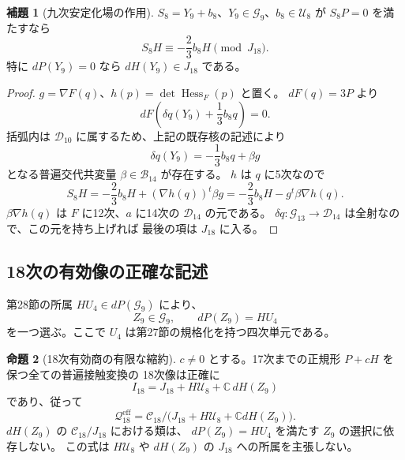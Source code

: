 \documentclass[a4paper,11pt]{ltjsarticle}
\theoremstyle{definition}
\newtheorem{theorem}{命題}[section]
\newtheorem{lemma}[theorem]{補題}
\newcommand{\CC}{\mathbb C}
\begin{document}
\begin{lemma}[九次安定化場の作用]
\label{lem:v14-ninth-stabilizer-hessian}
$S_8=Y_9+b_8$、$Y_9\in\mathcal G_9$、$b_8\in\mathcal U_8$ が
$S_8P=0$ を満たすなら
\[
 S_8H\equiv-\frac23b_8H\pmod{J_{18}}.
\]
特に $dP(Y_9)=0$ なら $dH(Y_9)\in J_{18}$ である。
\end{lemma}

\begin{proof}
$g=\nabla F(q)$、$h(p)=\det\operatorname{Hess}_F(p)$ と置く。
$dF(q)=3P$ より
\[
 dF\left(\delta q(Y_9)+\frac13b_8q\right)=0.
\]
括弧内は $\mathcal D_{10}$ に属するため、上記の既存核の記述により
\[
 \delta q(Y_9)=-\frac13b_8q+\beta g
\]
となる普遍交代共変量 $\beta\in\mathcal B_{14}$ が存在する。
$h$ は $q$ に5次なので
\[
 S_8H=-\frac23b_8H+(\nabla h(q))^t\beta g
     =-\frac23b_8H-g^t\beta\nabla h(q).
\]
$\beta\nabla h(q)$ は $F$ に12次、$a$ に14次の $\mathcal D_{14}$ の元である。
$\delta q:\mathcal G_{13}\to\mathcal D_{14}$ は全射なので、この元を持ち上げれば
最後の項は $J_{18}$ に入る。
\end{proof}

\subsection{18次の有効像の正確な記述}

第28節の所属 $HU_4\in dP(\mathcal G_9)$ により、
\[
 Z_9\in\mathcal G_9,\qquad dP(Z_9)=HU_4
\]
を一つ選ぶ。ここで $U_4$ は第27節の規格化を持つ四次単元である。

\begin{theorem}[18次有効商の有限な縮約]
\label{thm:v14-effective-eighteenth}
$c\ne0$ とする。17次までの正規形 $P+cH$ を保つ全ての普遍接触変換の
18次像は正確に
\begin{equation}\label{eq:v14-effective-image}
 I_{18}=J_{18}+H\mathcal U_8+\CC\,dH(Z_9)
\end{equation}
であり、従って
\[
 \mathcal Q^{\mathrm{eff}}_{18}
 =\mathcal C_{18}/\bigl(J_{18}+H\mathcal U_8+\CC dH(Z_9)\bigr).
\]
$dH(Z_9)$ の $\mathcal C_{18}/J_{18}$ における類は、
$dP(Z_9)=HU_4$ を満たす $Z_9$ の選択に依存しない。
この式は $H\mathcal U_8$ や $dH(Z_9)$ の $J_{18}$ への所属を主張しない。
\end{theorem}
\end{document}
